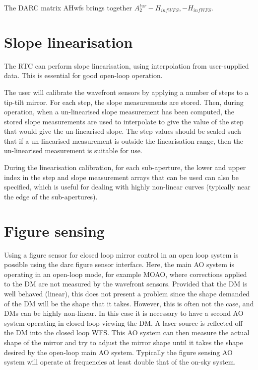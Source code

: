 \documentclass[a4,10pt]{article}
\begin{document}
The DARC matrix AHwfs brings together $A_2^{tur}-H_{infWFS}, -H_{infWFS}$.



\section{Slope linearisation}
\label{sect:linearisation}
The RTC can perform slope linearisation, using interpolation from
user-supplied data.  This is essential for good open-loop operation.

The user will calibrate the wavefront sensors by applying a number of
steps to a tip-tilt mirror.  For each step, the slope measurements are
stored.  Then, during operation, when a un-linearised slope
measurement has been computed, the stored slope measurements are used
to interpolate to give the value of the step that would give the
un-linearised slope.  The step values should be scaled such that if a
un-linearised measurement is outside the linearisation range, then the
un-linearised measurement is suitable for use.

During the linearisation calibration, for each sub-aperture, the lower
and upper index in the step and slope measurement arrays that can be
used can also be specified, which is useful for dealing with highly
non-linear curves (typically near the edge of the sub-apertures).  

\section{Figure sensing}
Using a figure sensor for closed loop mirror control in an open loop
system is possible using the darc figure sensor interface.  Here, the
main AO system is operating in an open-loop mode, for example MOAO,
where corrections applied to the DM are not measured by the wavefront
sensors.  Provided that the DM is well behaved (linear), this does not
present a problem since the shape demanded of the DM will be the shape
that it takes.  However, this is often not the case, and DMs can be
highly non-linear.  In this case it is necessary to have a second AO
system operating in closed loop viewing the DM.  A laser source is
reflected off the DM into the closed loop WFS.  This AO system can
then measure the actual shape of the mirror and try to adjust the
mirror shape until it takes the shape desired by the open-loop main AO
system.  Typically the figure sensing AO system will operate at
frequencies at least double that of the on-sky system.  
\end{document}

